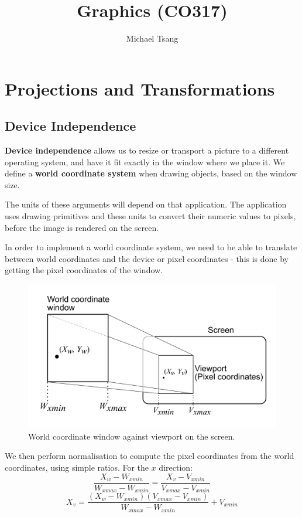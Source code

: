 \documentclass[11pt]{article}
\title{Graphics (CO317)}
\author{Michael Tsang}
\begin{document}
\maketitle

\section{Projections and Transformations}
\subsection{Device Independence}
\textbf{Device independence} allows us to resize or transport a picture to a different operating system, and have it fit exactly in the window where we place it.
We define a \textbf{world coordinate system} when drawing objects, based on the window size.

The units of these arguments will depend on that application.
The application uses drawing primitives and these units to convert their numeric values to pixels, before the image is rendered on the screen.

In order to implement a world coordinate system, we need to be able to translate between world coordinates and the device or pixel coordinates - this is done by getting the pixel coordinates of the window.

\begin{figure}[htb!]
  \caption{World coordinate window against viewport on the screen.}
  \includegraphics[scale=0.4]{normalisation}
  \centering
\end{figure}

We then perform normalisation to compute the pixel coordinates from the world coordinates, using simple ratios.
For the $x$ direction:
\[
  \frac{X_w - W_{xmin}}{W_{xmax} - W_{xmin}} = \frac{X_v - V_{xmin}}{V_{xmax} - V_{xmin}}
\]
\[
  X_v = \frac{(X_w - W_{xmin})(V_{xmax} - V_{xmin})}{W_{xmax} - W_{xmin}} + V_{xmin}
\]
\end{document}
